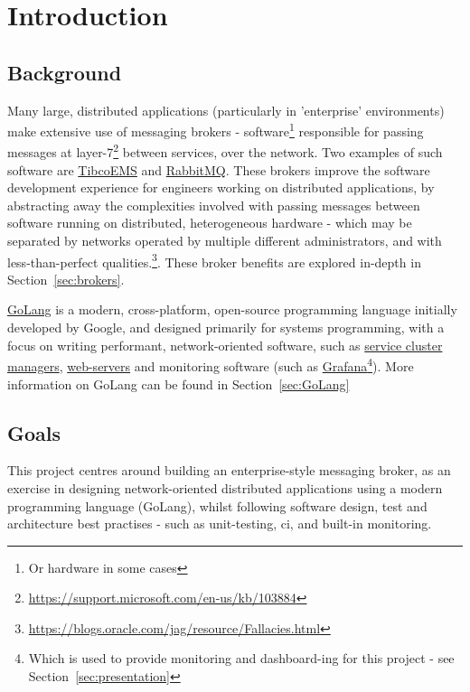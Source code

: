 \chapter{Introduction}
\label{chap:Introduction}

\section{Background}
\label{sec:background}

Many large, distributed applications (particularly in 'enterprise' environments)
make extensive use of messaging brokers - software\footnote{Or hardware in some
cases\cite{solaceappliances}} responsible for passing messages at
layer-7\footnote{\url{https://support.microsoft.com/en-us/kb/103884}} between
services, over the network. Two examples of such software are
\href{http://www.tibco.com/products/automation/enterprise-messaging/enterprise-message-service}{TibcoEMS}
and \href{https://www.rabbitmq.com/}{RabbitMQ}. These brokers improve the
software development experience for engineers working on distributed
applications, by abstracting away the complexities involved with passing
messages between software running on distributed, heterogeneous hardware - which
may be separated by networks operated by multiple different administrators, and
with less-than-perfect
qualities.\footnote{\url{https://blogs.oracle.com/jag/resource/Fallacies.html}}.
These broker benefits are explored in-depth in Section~\ref{sec:brokers}.

\href{https://golang.org/}{GoLang} is a modern, cross-platform, open-source
programming language initially developed by Google, and designed primarily for
systems programming, with a focus on writing performant, network-oriented
software, such as \href{https://github.com/kubernetes/kubernetes}{service
cluster managers}, \href{https://github.com/mholt/caddy}{web-servers} and
monitoring software (such as
\href{https://github.com/grafana/grafana}{Grafana}\footnote{Which is used to
provide monitoring and dashboard-ing for this project - see
Section~\ref{sec:presentation}}). More information on GoLang can be found in
Section~\ref{sec:GoLang}

\section{Goals}
This project centres around building an enterprise-style messaging broker, as an
exercise in designing network-oriented distributed applications using a modern
programming language (GoLang), whilst following software design, test and
architecture best practises - such as unit-testing, \gls{ci}, and
built-in monitoring.

